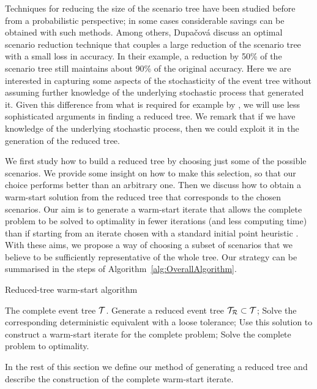 Techniques for reducing the size of the scenario tree have been studied 
before from a probabilistic perspective; in some cases considerable 
savings can be obtained with such methods. Among others, 
Dupa\v{c}ov{\'a} \etal \cite{Dupacova} discuss an optimal scenario 
reduction technique that couples a large reduction of the scenario 
tree with a small loss in accuracy. In their example, a reduction by 
50\% of the scenario tree still maintains about 90\% of the original 
accuracy.
Here we are interested in capturing some aspects of the 
stochasticity of the event tree without assuming further knowledge of
the underlying stochastic process that generated it. Given this difference 
from what is required for example by \cite{Dupacova}, we will use less 
sophisticated arguments in finding a reduced tree.
We remark that if we have knowledge of the underlying stochastic process,
then we could exploit it in the generation of the reduced tree.

We first study how to build a reduced tree by choosing just 
some of the possible scenarios. We provide some insight on how to make 
this selection, so that our choice performs better than an arbitrary 
one.
Then we discuss how to obtain a warm-start solution from the reduced 
tree that corresponds to the chosen scenarios.
Our aim is to generate a warm-start iterate that allows
the complete problem to be solved to optimality in fewer iterations
(and less computing time) than if starting from an iterate chosen with
a standard initial point heuristic \cite{Mehrotra92}.
With these aims, we propose a way of choosing a subset of scenarios 
that we believe to be sufficiently representative of the whole tree.
Our strategy can be summarised in the steps of
Algorithm~\ref{alg:OverallAlgorithm}.
%
\begin{algorithm}[h]
  \caption{Reduced-tree warm-start algorithm}
  \begin{algorithmic}[0]  \label{alg:OverallAlgorithm}
    \REQUIRE The complete event tree $\mathcal{T}$.
    \smallskip
    \STATE Generate a reduced event tree $\mathcal{T}_\mathcal{R}\subset\mathcal{T}$;
    \smallskip
    \STATE Solve the corresponding deterministic equivalent with a loose 
           tolerance;
    \smallskip
    \STATE Use this solution to construct a warm-start iterate for the 
    complete problem;
    \smallskip
    \STATE Solve the complete problem to optimality.
  \end{algorithmic}
\end{algorithm}

In the rest of this section we define our method of generating a 
reduced tree and describe the construction of the complete warm-start 
iterate.

